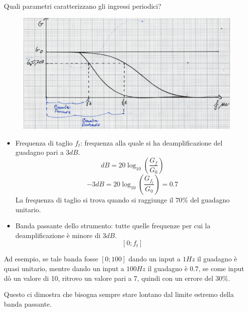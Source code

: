 \documentclass[a4paper, 15pt]{article}
\begin{document}
\begin{adjustwidth}{2in}{}
	Quali parametri caratterizzano gli ingressi periodici? 
\begin{figure}[H]
	\centering
	\includegraphics[width=0.5\linewidth]{fig/mm1}
	\label{fig:mm1}
\end{figure}
	\begin{itemize}
	\item Frequenza di taglio $f_t$: frequenza alla quale si ha deamplificazione del guadagno pari a $3dB$. 
	\[ dB = 20 \log_{10}\left( \dfrac{G_f}{G_0}\right) \]
	\[ -3dB = 20 \log_{10}\left( \dfrac{G_{f_t}}{G_0}\right)  = 0.7 \]
	La frequenza di taglio si trova quando si raggiunge il $70\%$ del guadagno unitario.
	\item Banda passante dello strumento: tutte quelle frequenze per cui la deamplificazione è minore di $3dB$.
	\[[0;f_t]\]
	\end{itemize}
	Ad esempio, se tale banda fosse $[0;100]$ dando un input a $1Hz$ il guadagno è quasi unitario, mentre dando un input a $100Hz$ il guadagno è $0.7$, se come input dò un valore di 10, ritrovo un valore pari a 7, quindi con un errore del $30\%$.
	
	Questo ci dimostra che bisogna sempre stare lontano dal limite estremo della banda passante. \newline
	

\end{adjustwidth}
\end{document}
